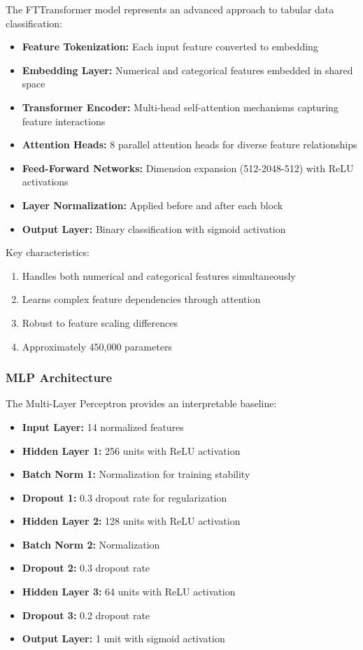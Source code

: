 \documentclass[12pt,a4paper,twoside]{report}
\begin{document}
The FTTransformer model represents an advanced approach to tabular data classification:

\begin{itemize}
    \item \textbf{Feature Tokenization:} Each input feature converted to embedding
    \item \textbf{Embedding Layer:} Numerical and categorical features embedded in shared space
    \item \textbf{Transformer Encoder:} Multi-head self-attention mechanisms capturing feature interactions
    \item \textbf{Attention Heads:} 8 parallel attention heads for diverse feature relationships
    \item \textbf{Feed-Forward Networks:} Dimension expansion (512-2048-512) with ReLU activations
    \item \textbf{Layer Normalization:} Applied before and after each block
    \item \textbf{Output Layer:} Binary classification with sigmoid activation
\end{itemize}

Key characteristics:

\begin{enumerate}
    \item Handles both numerical and categorical features simultaneously
    \item Learns complex feature dependencies through attention
    \item Robust to feature scaling differences
    \item Approximately 450,000 parameters
\end{enumerate}

\subsubsection{MLP Architecture}

The Multi-Layer Perceptron provides an interpretable baseline:

\begin{itemize}
    \item \textbf{Input Layer:} 14 normalized features
    \item \textbf{Hidden Layer 1:} 256 units with ReLU activation
    \item \textbf{Batch Norm 1:} Normalization for training stability
    \item \textbf{Dropout 1:} 0.3 dropout rate for regularization
    \item \textbf{Hidden Layer 2:} 128 units with ReLU activation
    \item \textbf{Batch Norm 2:} Normalization
    \item \textbf{Dropout 2:} 0.3 dropout rate
    \item \textbf{Hidden Layer 3:} 64 units with ReLU activation
    \item \textbf{Dropout 3:} 0.2 dropout rate
    \item \textbf{Output Layer:} 1 unit with sigmoid activation
\end{itemize}
\end{document}
